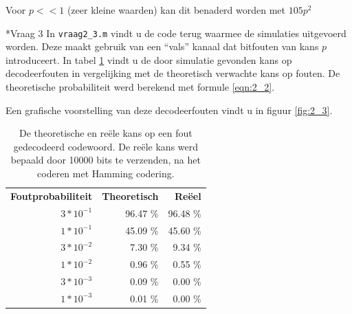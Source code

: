 \documentclass[]{article}
\begin{document}
\begin{section}
\begin{subsection}
        Voor $p << 1$ (zeer kleine waarden) kan dit benaderd worden
        met $105p^2$

    \end{subsection}

    \begin{subsection}*{Vraag 3} %
        In \texttt{vraag2\_3.m} vindt u de code terug waarmee de
        simulaties uitgevoerd worden. Deze maakt gebruik van een
        ``vals'' kanaal dat bitfouten van kans $p$ introduceert. In
        tabel \ref{tab:2_3} vindt u de door simulatie gevonden
        kans op decodeerfouten in vergelijking met de theoretisch verwachte
        kans op fouten. De theoretische probabiliteit werd
        berekend met formule \ref{eqn:2_2}.

        Een grafische voorstelling van deze decodeerfouten vindt u in
        figuur \ref{fig:2_3}.

        \begin{table}
            \centering
            \begin{tabular}{rrr}
                \textbf{Foutprobabiliteit} &
                \textbf{Theoretisch} &
                \textbf{Re\"eel} \\
                $3 * 10^{-1}$ & 96.47 \% & 96.48 \% \\
                $1 * 10^{-1}$ & 45.09 \% & 45.60 \% \\
                $3 * 10^{-2}$ &  7.30 \% &  9.34 \% \\
                $1 * 10^{-2}$ &  0.96 \% &  0.55 \% \\
                $3 * 10^{-3}$ &  0.09 \% &  0.00 \% \\
                $1 * 10^{-3}$ &  0.01 \% &  0.00 \%
            \end{tabular}
            \caption{De theoretische en re\"ele kans op een fout
                gedecodeerd codewoord. De re\"ele kans werd bepaald
                door 10000 bits te verzenden, na het coderen met
            Hamming codering.}
            \label{tab:2_3}
        \end{table}


\end{subsection}
\end{section}
\end{document}
